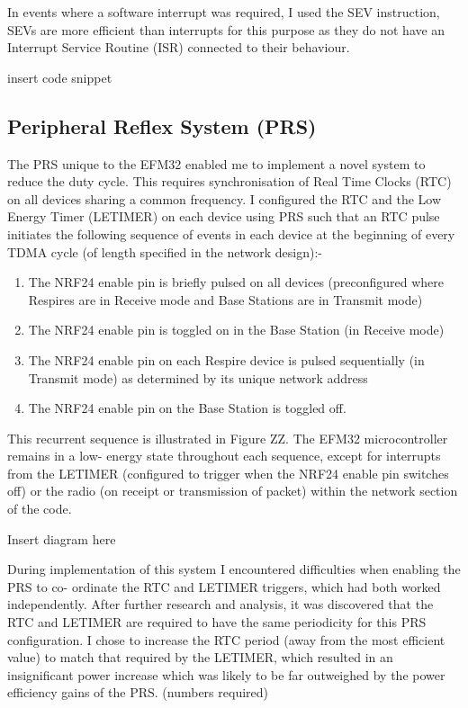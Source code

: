 In events where a software interrupt was required, I used the SEV instruction, SEVs are more
efficient than interrupts for this purpose as they do not have an Interrupt Service Routine (ISR)
connected to their behaviour.


{insert code snippet}


\subsection{Peripheral Reflex System (PRS)}
The PRS unique to the EFM32 enabled me to implement a novel system to reduce the duty cycle.
This requires synchronisation of Real Time Clocks (RTC) on all devices sharing a common frequency. I
configured the RTC and the Low Energy Timer (LETIMER) on each device using PRS such that an RTC
pulse initiates the following sequence of events in each device at the beginning of every TDMA cycle
(of length specified in the network design):-
\begin{enumerate}
  \item The NRF24 enable pin is briefly pulsed on all devices (preconfigured where Respires are in
        Receive mode and Base Stations are in Transmit mode)
  \item The NRF24 enable pin is toggled on in the Base Station (in Receive mode)
  \item The NRF24 enable pin on each Respire device is pulsed sequentially (in Transmit mode) as
        determined by its unique network address
  \item The NRF24 enable pin on the Base Station is toggled off.
\end{enumerate}


This recurrent sequence is illustrated in Figure ZZ. The EFM32 microcontroller remains in a low-
energy state throughout each sequence, except for interrupts from the LETIMER (configured to
trigger when the NRF24 enable pin switches off) or the radio (on receipt or transmission of packet)
within the network section of the code.


Insert diagram here


During implementation of this system I encountered difficulties when enabling the PRS to co-
ordinate the RTC and LETIMER triggers, which had both worked independently. After further
research and analysis, it was discovered that the RTC and LETIMER are required to have the same
periodicity for this PRS configuration. I chose to increase the RTC period (away from the most
efficient value) to match that required by the LETIMER, which resulted in an insignificant power
increase which was likely to be far outweighed by the power efficiency gains of the PRS. (numbers
required)

